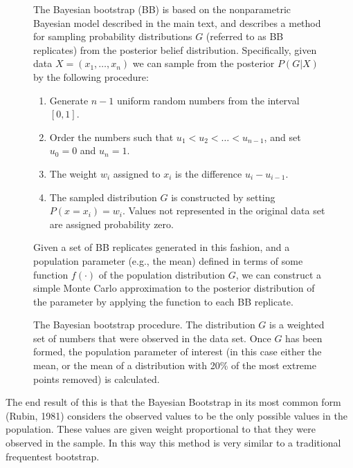 \documentclass[doc]{apa6}
\begin{document}
{\begin{figure}[t]
\begin{boxedminipage}{1\textwidth}\small
The Bayesian bootstrap (BB) is based on the nonparametric Bayesian model described in the main text, and describes a method for sampling probability distributions $G$ (referred to as BB replicates) from the posterior belief distribution. Specifically, given data $X=(x_1,\ldots,x_n)$ we can sample from the posterior $P(G|X)$ by the following procedure:
\begin{enumerate}\setlength{\parskip}{0pt}
\item Generate $n-1$ uniform random numbers from the interval $[0,1]$.
\item Order the numbers such that $u_1 < u_2 < \ldots < u_{n-1}$, and set $u_0 = 0$ and $u_n=1$.
\item The weight $w_i$ assigned to $x_i$ is the difference $u_{i}-u_{i-1}$.
\item The sampled distribution $G$ is constructed by setting $P(x = x_i) = w_i$. Values not represented in the original data set are assigned probability zero.
\end{enumerate}
Given a set of BB replicates generated in this fashion, and a population parameter (e.g., the mean) defined in terms of some function $f(\cdot)$ of the population distribution $G$, we can construct a simple Monte Carlo approximation to the posterior distribution of the parameter by applying the function to each BB replicate.
\end{boxedminipage}
\vspace*{6pt}
\caption{The Bayesian bootstrap procedure.   The distribution $G$ is a weighted set of numbers that were observed in the data set. Once $G$ has been formed, the population parameter of interest (in this case either the mean, or the mean of a distribution with 20\% of the most extreme points removed) is calculated. }
\label{bbalgorithm}
\end{figure}

  The end result of this is that  the Bayesian Bootstrap in its most common form (Rubin, 1981) considers the observed values to be the only possible values in the population. These values are given weight proportional to that they were observed in the sample. In this way this method is very similar to a traditional frequentest bootstrap.

}
\end{document}
